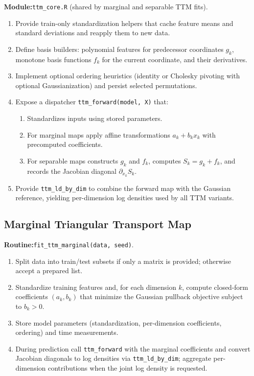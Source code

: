 \documentclass[11pt,a4paper,twoside]{book}\usepackage[]{graphicx}\usepackage[]{xcolor}
\begin{document}
\textbf{Module:}\quad\texttt{ttm\_core.R} (shared by marginal and separable TTM fits).

\begin{enumerate}
  \item Provide train-only standardization helpers that cache feature means and standard deviations and reapply them to new data.
  \item Define basis builders: polynomial features for predecessor coordinates $g_k$, monotone basis functions $f_k$ for the current coordinate, and their derivatives.
  \item Implement optional ordering heuristics (identity or Cholesky pivoting with optional Gaussianization) and persist selected permutations.
  \item Expose a dispatcher \texttt{ttm\_forward(model, X)} that:
    \begin{enumerate}
      \item Standardizes inputs using stored parameters.
      \item For marginal maps apply affine transformations $a_k + b_k x_k$ with precomputed coefficients.
      \item For separable maps constructs $g_k$ and $f_k$, computes $S_k = g_k + f_k$, and records the Jacobian diagonal $\partial_{x_k} S_k$.
    \end{enumerate}
  \item Provide \texttt{ttm\_ld\_by\_dim} to combine the forward map with the Gaussian reference, yielding per-dimension log densities used by all TTM variants.
\end{enumerate}

\subsection{Marginal Triangular Transport Map}\label{app:ttm-marg}

\textbf{Routine:}\quad\texttt{fit\_ttm\_marginal(data, seed)}.

\begin{enumerate}
  \item Split data into train/test subsets if only a matrix is provided; otherwise accept a prepared list.
  \item Standardize training features and, for each dimension $k$, compute closed-form coefficients $(a_k, b_k)$ that minimize the Gaussian pullback objective subject to $b_k > 0$.
  \item Store model parameters (standardization, per-dimension coefficients, ordering) and time measurements.
  \item During prediction call \texttt{ttm\_forward} with the marginal coefficients and convert Jacobian diagonals to log densities via \texttt{ttm\_ld\_by\_dim}; aggregate per-dimension contributions when the joint log density is requested.
\end{enumerate}
\end{document}

